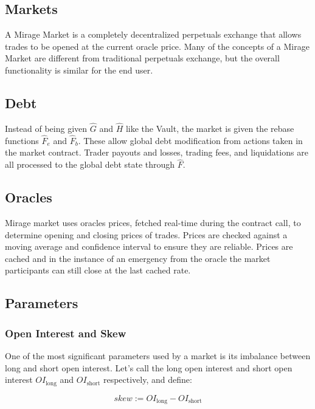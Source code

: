 \documentclass[letterpaper]{article}
\begin{document}
\begin{multicols}{2}
\section{Markets}
\label{sec:mirage-markets}

A Mirage Market is a completely decentralized perpetuals exchange that allows trades to be opened at the current oracle price. Many of the concepts of a Mirage Market are different from traditional perpetuals exchange, but the overall functionality is similar for the end user. 

\subsection{Debt}

Instead of being given $\hat{G}$ and $\hat{H}$ like the Vault, the market is given the rebase functions $\hat{F}_e$ and $\hat{F}_b$. These allow global debt modification from actions taken in the market contract. Trader payouts and losses, trading fees, and liquidations are all processed to the global debt state through $\hat{F}$.

\subsection{Oracles}

Mirage market uses oracles prices, fetched real-time during the contract call, to determine opening and closing prices of trades. Prices are checked against a moving average and confidence interval to ensure they are reliable. Prices are cached and in the instance of an emergency from the oracle the market participants can still close at the last cached rate.

\subsection{Parameters}

\subsubsection{Open Interest and Skew}

One of the most significant parameters used by a market is its imbalance between long and short open interest. Let's call the long open interest and short open interest $OI_{\text{long}}$ and $OI_{\text{short}}$ respectively, and define:

\begin{equation}
    \label{eq:skew}
    skew := OI_{\text{long}} - OI_{\text{short}}
\end{equation}


\end{multicols}
\end{document}
